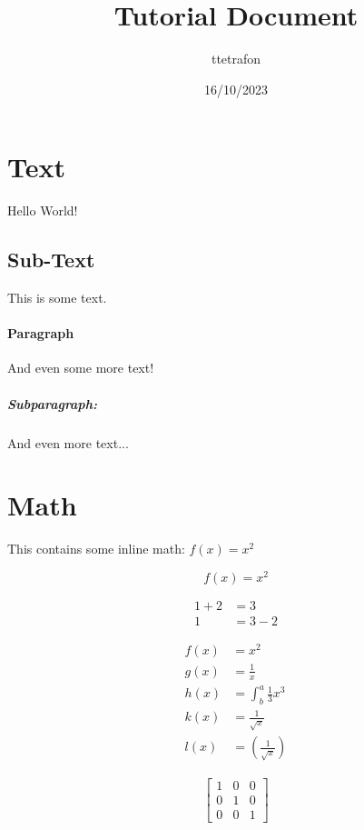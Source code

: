\documentclass{article}
\title{Tutorial Document}
\date{16/10/2023}
\author{ttetrafon}
\begin{document}
\maketitle
\newpage


\tableofcontents
\newpage

\section{Text}
Hello World!

\subsection{Sub-Text}
This is some text.

\paragraph{Paragraph}
And even some more text!

\subparagraph{Subparagraph:}
And even more text...

\section{Math}
This contains some inline math: $f(x) = x^2$

\begin{equation}
  f(x) = x^2
\end{equation}

\begin{align*}
  1 + 2 & = 3     \\
  1     & = 3 - 2
\end{align*}

\begin{align}
  f(x) & = x^2                             \\
  g(x) & = \frac{1}{x}                     \\
  h(x) & = \int^a_b \frac{1}{3}x^3         \\
  k(x) & = \frac{1}{\sqrt{x}}              \\
  l(x) & = \left(\frac{1}{\sqrt{x}}\right)
\end{align}

\begin{align*}
  \left[
    \begin{matrix}
      1 & 0 & 0 \\
      0 & 1 & 0 \\
      0 & 0 & 1
    \end{matrix}
    \right]
\end{align*}
\end{document}
